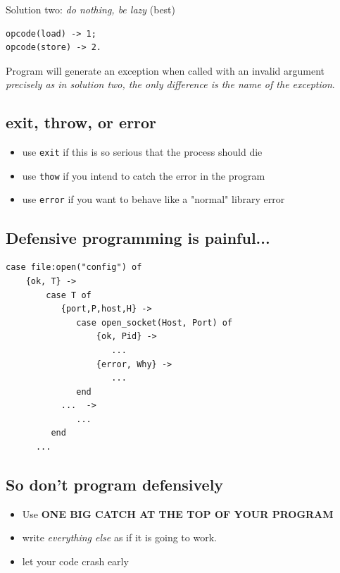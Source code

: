 \documentclass[12pt]{article}
\begin{document}
Solution two: {\sl do nothing, be lazy} (best)

\begin{verbatim}
opcode(load) -> 1;
opcode(store) -> 2.
\end{verbatim}

Program will generate an exception when called with an invalid
argument {\sl precisely as in solution two, the only difference
is the name of the exception}.

\subsection{exit, throw, or error}

\begin{itemize}
\item use \verb+exit+ if this is so serious that the process should die
\item use \verb+thow+ if you intend to catch the error in the program
\item use \verb+error+ if you want to behave like a "normal" library error
\end{itemize}

\subsection{Defensive programming is painful...}

\begin{verbatim}
case file:open("config") of
    {ok, T} ->
        case T of
           {port,P,host,H} ->
              case open_socket(Host, Port) of
                  {ok, Pid} ->
                     ...
                  {error, Why} ->
                     ...
              end
           ...  ->
              ...
         end
      ...
\end{verbatim}

\subsection{So don't program defensively}

\begin{itemize}
\item Use {\bf ONE BIG CATCH AT THE TOP OF YOUR PROGRAM}
\item write {\sl everything else} as if it is going to work.
\item let your code crash early
\end{itemize}
\end{document}

